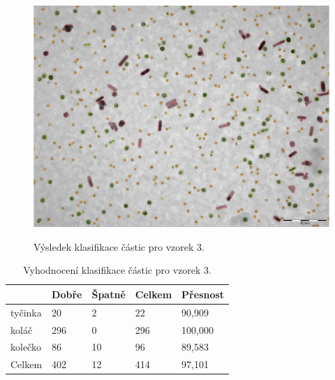 \documentclass[11pt,twoside,a4paper,table]{book}
\begin{document}
\begin{figure}[h]
\center
\includegraphics[width=\textwidth]{figures/multi4_klasifikace.png}
\label{fig:class3}
\caption{Výsledek klasifikace částic pro vzorek 3.}
\end{figure}

\begin{table}[h]
\begin{center}
\begin{tabular}{lllll}
\rowcolor[HTML]{9B9B9B} 
\multicolumn{1}{|l|}{\cellcolor[HTML]{9B9B9B}Třída} & \multicolumn{1}{l|}{\cellcolor[HTML]{9B9B9B}Dobře} & \multicolumn{1}{l|}{\cellcolor[HTML]{9B9B9B}Špatně}  & \multicolumn{1}{l|}{\cellcolor[HTML]{9B9B9B}Celkem} & \multicolumn{1}{l|}{\cellcolor[HTML]{9B9B9B}Přesnost} \\ \hline
\multicolumn{1}{|l|}{tyčinka}                             & \multicolumn{1}{l|}{20}                            & \multicolumn{1}{l|}{2}                               & \multicolumn{1}{l|}{22}                             & \multicolumn{1}{l|}{90,909}                           \\ \hline
\multicolumn{1}{|l|}{koláč}                             & \multicolumn{1}{l|}{296}                           & \multicolumn{1}{l|}{0}                               & \multicolumn{1}{l|}{296}                            & \multicolumn{1}{l|}{100,000}                          \\ \hline
\multicolumn{1}{|l|}{kolečko}                             & \multicolumn{1}{l|}{86}                            & \multicolumn{1}{l|}{10}                              & \multicolumn{1}{l|}{96}                             & \multicolumn{1}{l|}{89,583}                           \\ \hline
\multicolumn{1}{|l|}{Celkem}                        & \multicolumn{1}{l|}{402}                           & \multicolumn{1}{l|}{12}                              & \multicolumn{1}{l|}{414}                            & \multicolumn{1}{l|}{97,101}                           \\ \hline
\end{tabular}
\end{center}
\caption{Vyhodnocení klasifikace částic pro vzorek 3.}
\label{tab:classresult3}
\end{table}
\end{document}
